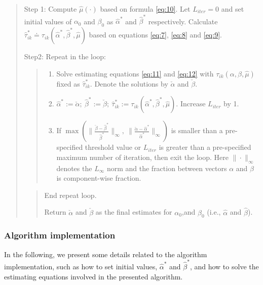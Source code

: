 \begin{quote}
Step 1: Compute \(\hat{\mu} (\cdot)\) based on formula \eqref{eq:10}. Let \(L_{iter}=0\) and set initial values of \(\alpha _0\) and \(\beta _0\) as \(\hat{\alpha}^{*}\) and
\(\hat{\beta}^{*}\) respectively. Calculate
\(\hat{\tau}^*_{ik} \doteq \tau _{ik} (\hat{\alpha}^{*}, \hat{\beta}^{*}, \hat{\mu})\)
based on equations \eqref{eq:7}, \eqref{eq:8} and \eqref{eq:9}.

Step2: Repeat in the loop:

\begin{quote}
\begin{enumerate}
\def\labelenumi{(\roman{enumi})}
\item
  Solve estimating equations \eqref{eq:11} and \eqref{eq:12} with
  \(\tau _{ik} (\alpha, \beta, \hat{\mu})\) fixed as
  \(\hat{\tau}^*_{ik}\). Denote the solutions by \(\check{\alpha}\) and
  \(\check{\beta}\).
\item
  \(\hat{\alpha}^{*} := \check{\alpha}; \: \hat{\beta}^{*} := \check{\beta}; \: \hat{\tau}^* _{ik} := \tau _{ik} (\hat{\alpha}^{*}, \hat{\beta}^{*}, \hat{\mu})\). Increase \(L_{iter}\) by 1.
\item
  If
  \(\max{ ( \| \frac{\check{\beta} - \hat{\beta}^{*}}{\hat{\beta}^{*}} \| _{\infty} , \: \| \frac{\check{\alpha} - \hat{\alpha}^{*}}{\hat{\alpha}^{*}} \| _{\infty} ) }\)
  is smaller than a pre-specified threshold value or \(L_{iter}\) is greater than a pre-specified maximum number of iteration, then exit the loop. Here \(\| \cdot \| _{\infty}\)
  denotes the \(L _{\infty}\) norm and the fraction between vectors
  \(\alpha\) and \(\beta\) is component-wise fraction.
\end{enumerate}
\end{quote}

\begin{quote}
End repeat loop.

Return \(\check{\alpha}\) and \(\check{\beta}\) as the final estimates for \(\alpha_0\),and \(\beta_0\) (i.e., \(\hat\alpha\) and \(\hat\beta\)).
\end{quote}
\end{quote}

\hypertarget{algorithm-implementation}{%
\subsubsection{Algorithm implementation}\label{algorithm-implementation}}

In the following, we present some details related to the algorithm implementation, such as how to set initial values, \(\hat\alpha^*\) and \(\hat\beta^*\), and how to solve the estimating equations involved in the presented algorithm.


